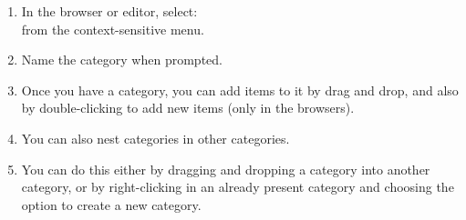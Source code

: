 \begin{enumerate}
\item In the browser or editor, select:\\
 from the context-sensitive menu. 
\item Name the category when prompted.
\item Once you have a category, you can add items to it by drag and drop, and also by double-clicking to add new items (only in the browsers). 
\item You can also nest categories in other categories. 
\item You can do this either by dragging and dropping a category into another category, or by right-clicking in an already present category and choosing the option to create a new category. 
\end{enumerate}
